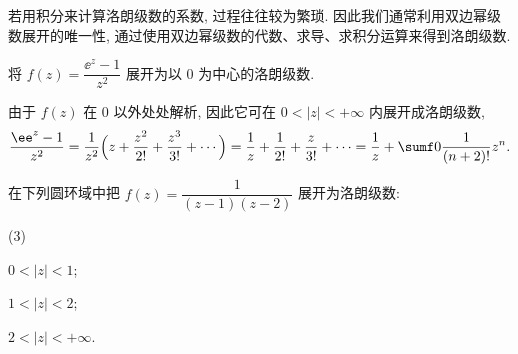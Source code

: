 若用积分来计算洛朗级数的系数, 过程往往较为繁琐.
因此我们通常利用双边幂级数展开的唯一性, 通过\alert{使用双边幂级数的代数、求导、求积分运算}来得到洛朗级数.

\begin{example}
  将 $f(z)=\dfrac{\ee^z-1}{z^2}$ 展开为以 $0$ 为中心的洛朗级数.
\end{example}

\begin{solution}
  由于 $f(z)$ 在 $0$ 以外处处解析, 因此它可在 $0<|z|<+\infty$ 内展开成洛朗级数,
  \[
     \frac{\ee^z-1}{z^2}
    =\frac1{z^2}\Bigl(z+\frac{z^2}{2!}+\frac{z^3}{3!}+\cdots\Bigr)
    =\frac1z+\frac1{2!}+\frac{z}{3!}+\cdots
    =\frac1z+\sumf0 \frac1{(n+2)!}z^n.
  \]
\end{solution}

\begin{example}
  在下列圆环域中把 $f(z)=\dfrac1{(z-1)(z-2)}$ 展开为洛朗级数:
  \begin{subexample}(3)
    \item $0<|z|<1$;
    \item $1<|z|<2$;
    \item $2<|z|<+\infty$.
  \end{subexample}
\end{example}

